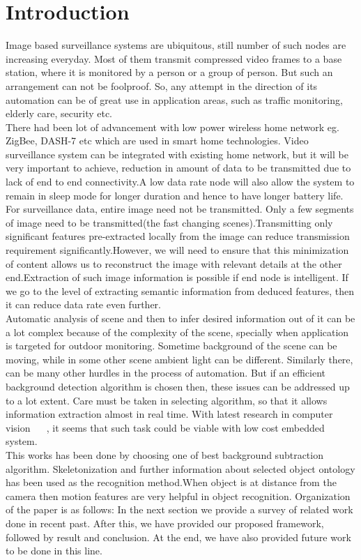 \documentclass[conference]{IEEEtran}
\begin{document}
\section{Introduction}
Image based surveillance systems are ubiquitous, still number of such
nodes are increasing everyday. Most of them transmit compressed video
frames to a base station, where it is monitored by a person or a group
of person. But such an arrangement can not be foolproof. So, any
attempt in the direction of its automation can be of great use in
application areas, such as traffic monitoring, elderly care, security
etc.\\
\indent There had been lot of advancement with low power wireless home
network eg. ZigBee, DASH-7 etc which are used in smart home
technologies. Video surveillance system can be integrated with existing
home network, but it will be very important to achieve, reduction in
amount of data to be transmitted due to lack of end to end
connectivity.A low data rate node will also allow the system to remain
in sleep mode for longer duration and hence to have longer battery
life.\\
\indent For surveillance data, entire image need not be transmitted.
Only a few segments of image need to be transmitted(the fast changing
scenes).Transmitting only significant features pre-extracted locally
from the image can reduce transmission requirement
significantly.However, we will need to ensure that this minimization of
content allows us to reconstruct the image with relevant details at the
other end.Extraction of such image information is possible if end node
is intelligent. If we go to the level of extracting semantic information
from deduced features, then it can reduce data rate even further.\\
\indent Automatic analysis of scene and then to infer desired
information out of it can be a lot complex because of the complexity of
the scene, specially when application is targeted for outdoor
monitoring.  Sometime background of the scene can be moving, while in
some other scene ambient light can be different. Similarly there, can be
many other hurdles in the process of automation. But if an efficient
background detection algorithm is chosen then, these issues can be
addressed up to a lot extent. Care must be taken in selecting algorithm,
so that it allows information extraction almost in real time. With
latest research in computer vision ~\cite{3} ~\cite{5}, it seems that
such task could be viable with low cost embedded system.\\
\indent This works has been done by choosing one of best background
subtraction algorithm. Skeletonization and further information about
selected object ontology has been used as the recognition method.When
object is at distance from the camera then motion features are very
helpful in object recognition. 
\indent Organization of the paper is as follows: In the next section we
provide a survey of related work done in recent past. After this, we
have provided our proposed framework, followed by result and conclusion.
At the end, we have also provided future work to be done in this line.
\end{document}
